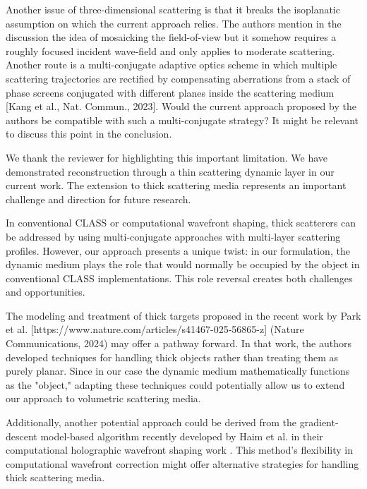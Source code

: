 \documentclass[12pt]{article}
\newenvironment{solved_reviewercomment}
    {\begin{tcolorbox}[width=\linewidth,colback=gray!5,colframe=solved_commentcolor!50,title=Reviewer Comment,left=5pt,right=5pt]}
    {\end{tcolorbox}}
\newenvironment{ourresponse}
    {\begin{tcolorbox}[width=\linewidth,breakable,enhanced,colback=gray!5,colframe=responsecolor!50,title=Response,left=5pt,right=5pt]}
    {\end{tcolorbox}}
\begin{document}
\begin{enumerate}[label=\arabic*.]
\begin{solved_reviewercomment}
        Another issue of three-dimensional scattering is that it breaks the isoplanatic assumption on which the current approach relies. The authors mention in the discussion the idea of mosaicking the field-of-view but it somehow requires a roughly focused incident wave-field and only applies to moderate scattering. Another route is a multi-conjugate adaptive optics scheme in which multiple scattering trajectories are rectified by compensating aberrations from a stack of phase screens conjugated with different planes inside the scattering medium [Kang et al., Nat. Commun., 2023]. Would the current approach proposed by the authors be compatible with such a multi-conjugate strategy? It might be relevant to discuss this point in the conclusion.
    \end{solved_reviewercomment}
    \begin{ourresponse}
        We thank the reviewer for highlighting this important limitation. We have demonstrated reconstruction through a thin scattering dynamic layer in our current work. The extension to thick scattering media represents an important challenge and direction for future research.
    
        In conventional CLASS or computational wavefront shaping, thick scatterers can be addressed by using multi-conjugate approaches with multi-layer scattering profiles. However, our approach presents a unique twist: in our formulation, the dynamic medium plays the role that would normally be occupied by the object in conventional CLASS implementations. This role reversal creates both challenges and opportunities.
        
        The modeling and treatment of thick targets proposed in the recent work by Park et al. [https://www.nature.com/articles/s41467-025-56865-z] (Nature Communications, 2024) may offer a pathway forward. In that work, the authors developed techniques for handling thick objects rather than treating them as purely planar. Since in our case the dynamic medium mathematically functions as the "object," adapting these techniques could potentially allow us to extend our approach to volumetric scattering media.
    
        Additionally, another potential approach could be derived from the gradient-descent model-based algorithm recently developed by Haim et al. in their computational holographic wavefront shaping work \cite{haim2024image}. This method's flexibility in computational wavefront correction might offer alternative strategies for handling thick scattering media.
        

\end{ourresponse}
\end{enumerate}
\end{document}
